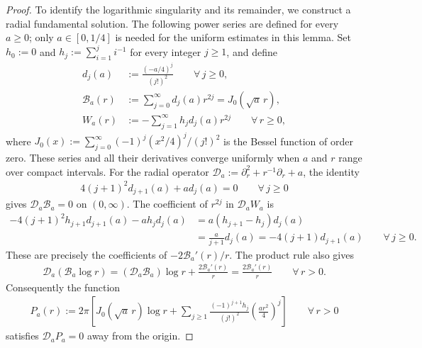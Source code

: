 \documentclass[a4paper,11pt,oneside,reqno]{amsart}
\numberwithin{equation}{section}
\theoremstyle{definition}
\begin{document}
\begin{proof}
    To identify the logarithmic singularity and its remainder,
    we construct a radial fundamental solution. The following
    power series are defined for every $a\geq0$; only
    $a\in[0,1/4]$ is needed for the uniform estimates in this
    lemma. Set $h_0:=0$ and
    $h_j:=\sum_{i=1}^j i^{-1}$ for every integer $j\geq1$,
    and define
    \begin{align*}
        d_j(a)&:=\frac{(-a/4)^j}{(j!)^2}
            \qquad\forall\,j\geq0,\\
        \mathcal B_a(r)&:=\sum_{j=0}^{\infty}d_j(a)r^{2j}
            =J_0(\sqrt a\,r),\\
        W_a(r)&:=-\sum_{j=1}^{\infty}h_jd_j(a)r^{2j}
            \qquad\forall\,r\geq0,
    \end{align*}
    where
    $J_0(x):=\sum_{j=0}^{\infty}(-1)^j(x^2/4)^j/(j!)^2$
    is the Bessel function of order zero. These series and
    all their derivatives converge uniformly when $a$ and $r$
    range over compact intervals. For the radial operator
    $\mathcal D_a:=\partial_r^2+r^{-1}\partial_r+a$, the identity
    \begin{align*}
        4(j+1)^2d_{j+1}(a)+ad_j(a)=0
        \qquad\forall\,j\geq0
    \end{align*}
    gives $\mathcal D_a\mathcal B_a=0$ on $(0,\infty)$.
    The coefficient of $r^{2j}$ in $\mathcal D_aW_a$ is
    \begin{align*}
        -4(j+1)^2h_{j+1}d_{j+1}(a)-ah_jd_j(a)
        &=a(h_{j+1}-h_j)d_j(a)\\
        &=\frac{a}{j+1}d_j(a)
        =-4(j+1)d_{j+1}(a)
        \qquad\forall\,j\geq0.
    \end{align*}
    These are precisely the coefficients of
    $-2\mathcal B_a'(r)/r$. The product rule also gives
    \begin{align*}
        \mathcal D_a(\mathcal B_a\log r)
        =(\mathcal D_a\mathcal B_a)\log r
        +\frac{2\mathcal B_a'(r)}r
        =\frac{2\mathcal B_a'(r)}r
        \qquad\forall\,r>0.
    \end{align*}
    Consequently the function
    \begin{align}
        \label{eq:s4-radial-fundamental}
        P_a(r):=2\pi\left[
        J_0(\sqrt a\,r)\log r+
        \sum_{j\geq1}\frac{(-1)^{j+1}h_j}{(j!)^2}
        \left(\frac{ar^2}{4}\right)^j
        \right]
        \qquad\forall\,r>0
    \end{align}
    satisfies $\mathcal D_aP_a=0$ away from the origin.


\end{proof}
\end{document}
